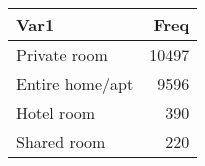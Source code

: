 
\begin{tabular}[t]{lr}
\toprule
Var1 & Freq\\
\midrule
Private room & 10497\\
Entire home/apt & 9596\\
Hotel room & 390\\
Shared room & 220\\
\bottomrule
\end{tabular}